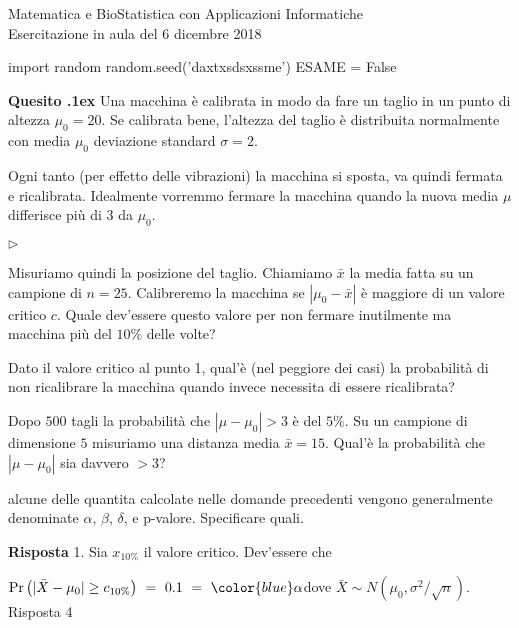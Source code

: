 \documentclass[11pt,twoside,a4paper]{article}
\newcommand{\mylabel}[1]{#1\hfill}
\renewenvironment{itemize}
  {\begin{list}{$\triangleright$}{%
   \setlength{\parskip}{0mm}
   \setlength{\topsep}{.4\baselineskip}
   \setlength{\rightmargin}{0mm}
   \setlength{\listparindent}{0mm}
   \setlength{\itemindent}{0mm}
   \setlength{\labelwidth}{2ex}
   \setlength{\itemsep}{.4\baselineskip}
   \setlength{\parsep}{0mm}
   \setlength{\partopsep}{0mm}
   \setlength{\labelsep}{1ex}
   \setlength{\leftmargin}{\labelwidth+\labelsep}
   \let\makelabel\mylabel}}{%
   \end{list}\vspace*{-1.3mm}}
\newcounter{quesito}
\newenvironment{question}{\addtocounter{quesito}{1}\par\textbf{Quesito \thequesito.\kern1ex}}{\vspace{0.5\parskip}}
\newenvironment{answer}{\par\textbf{Risposta\quad}}{\vspace{\parskip}}
\begin{document}
\colorbox{blue!10}{\begin{minipage}{\textwidth}
Matematica e BioStatistica con Applicazioni Informatiche\\
Esercitazione in aula del 6 dicembre 2018
\end{minipage}}



\begin{pycode}
import random
random.seed('daxtxsdsxssme')
ESAME = False
\end{pycode}


\bigskip\bigskip
\begin{question}
Una macchina è calibrata in modo da fare un taglio in un punto di altezza $\mu_0=20$. Se calibrata bene, l'altezza del taglio è distribuita normalmente con media $\mu_0$ deviazione standard $\sigma=2$. 

Ogni tanto (per effetto delle vibrazioni) la macchina si sposta, va quindi fermata e ricalibrata. Idealmente vorremmo fermare la macchina quando la nuova media $\mu$ differisce più di $3$ da $\mu_0$.

\begin{itemize}
\item[1.] Misuriamo quindi la posizione del taglio. Chiamiamo $\bar x$ la media fatta su un campione di $n=25$. Calibreremo la macchina se $|\mu_0-\bar x|$ è maggiore di un valore critico $c$. Quale dev'essere questo valore per non fermare inutilmente ma macchina più del $10\%$ delle volte?

\item[2.] Dato il valore critico al punto 1, qual'è (nel peggiore dei casi) la probabilità di non ricalibrare la macchina quando invece necessita di essere ricalibrata?

\item[3.] Dopo $500$ tagli la probabilità che $|\mu-\mu_0|>3$ è del $5\%$.  Su un campione di dimensione $5$ misuriamo una distanza media $\bar x=15$. Qual'è la probabilità che  $|\mu-\mu_0|$ sia davvero $>3$?

\item[4] alcune delle quantita calcolate nelle domande precedenti vengono generalmente denominate $\alpha$, $\beta$, $\delta$, e p-valore. Specificare quali.
\end{itemize}
\begin{answer}
1. Sia $x_{10\%}$ il valore critico. Dev'essere che 

$\Pr\big(|\bar X-\mu_0|\ge c_{10\%}\big)\ =\ 0.1\ =\ {\color{blue}\alpha}$\hfill dove $\bar X\sim N(\mu_0, \sigma^2/\sqrt{n})$.\hfill{\color{blue} Risposta 4} 


\end{answer}
\end{question}
\end{document}
